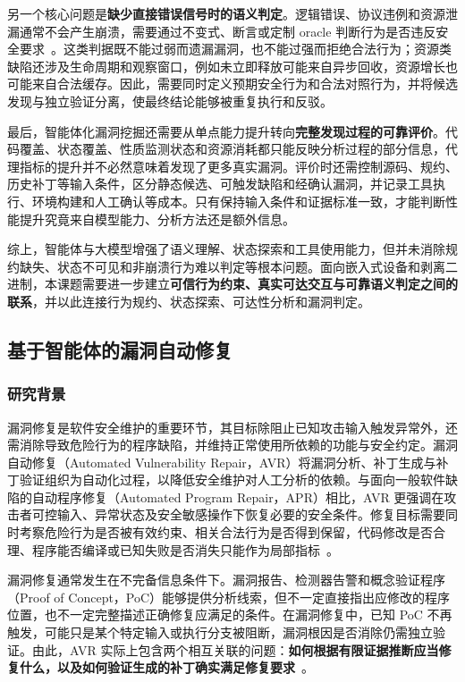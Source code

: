 另一个核心问题是\textbf{缺少直接错误信号时的语义判定}。逻辑错误、协议违例和资源泄漏通常不会产生崩溃，需要通过不变式、断言或定制 oracle 判断行为是否违反安全要求~\cite{protocolguard,inferroi}。这类判据既不能过弱而遗漏漏洞，也不能过强而拒绝合法行为；资源类缺陷还涉及生命周期和观察窗口，例如未立即释放可能来自异步回收，资源增长也可能来自合法缓存。因此，需要同时定义预期安全行为和合法对照行为，并将候选发现与独立验证分离，使最终结论能够被重复执行和反驳。

最后，智能体化漏洞挖掘还需要从单点能力提升转向\textbf{完整发现过程的可靠评价}。代码覆盖、状态覆盖、性质监测状态和资源消耗都只能反映分析过程的部分信息，代理指标的提升并不必然意味着发现了更多真实漏洞。评价时还需控制源码、规约、历史补丁等输入条件，区分静态候选、可触发缺陷和经确认漏洞，并记录工具执行、环境构建和人工确认等成本。只有保持输入条件和证据标准一致，才能判断性能提升究竟来自模型能力、分析方法还是额外信息。

综上，智能体与大模型增强了语义理解、状态探索和工具使用能力，但并未消除规约缺失、状态不可见和非崩溃行为难以判定等根本问题。面向嵌入式设备和剥离二进制，本课题需要进一步建立\textbf{可信行为约束、真实可达交互与可靠语义判定之间的联系}，并以此连接行为规约、状态探索、可达性分析和漏洞判定。

\subsection{基于智能体的漏洞自动修复}

\subsubsection{研究背景}

漏洞修复是软件安全维护的重要环节，其目标除阻止已知攻击输入触发异常外，还需消除导致危险行为的程序缺陷，并维持正常使用所依赖的功能与安全约定。漏洞自动修复（Automated Vulnerability Repair，AVR）将漏洞分析、补丁生成与补丁验证组织为自动化过程，以降低安全维护对人工分析的依赖。与面向一般软件缺陷的自动程序修复（Automated Program Repair，APR）相比，AVR 更强调在攻击者可控输入、异常状态及安全敏感操作下恢复必要的安全条件。修复目标需要同时考察危险行为是否被有效约束、相关合法行为是否得到保留，代码修改是否合理、程序能否编译或已知失败是否消失只能作为局部指标~\cite{sokavr}。

漏洞修复通常发生在不完备信息条件下。漏洞报告、检测器告警和概念验证程序（Proof of Concept，PoC）能够提供分析线索，但不一定直接指出应修改的程序位置，也不一定完整描述正确修复应满足的条件。在漏洞修复中，已知 PoC 不再触发，可能只是某个特定输入或执行分支被阻断，漏洞根因是否消除仍需独立验证。由此，AVR 实际上包含两个相互关联的问题：\textbf{如何根据有限证据推断应当修复什么，以及如何验证生成的补丁确实满足修复要求}~\cite{sokavr,smith2015cure}。


